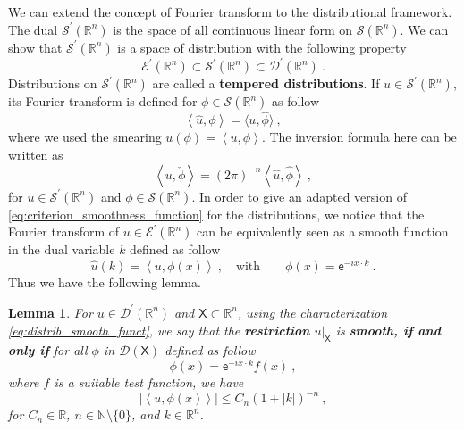 \documentclass[11pt]{book}
\newcommand{\abs}[1]{\left|#1\right|}
\newcommand{\sm}[1]{\left\langle#1\right\rangle}
\newcommand{\Dcal}{\mathcal{D}}
\newcommand{\Ecal}{\mathcal{E}}
\newcommand{\Scal}{\mathcal{S}}
\newcommand{\Nbb}{\mathbb{N}}
\newcommand{\Rbb}{\mathbb{R}}
\newcommand{\Xsf}{\mathsf{X}}
\newcommand{\esf}{\mathsf{e}}
\theoremstyle{break}
\newtheorem{lemma}{Lemma}[chapter]
\begin{document}
We can extend the concept of Fourier transform to the distributional framework. The dual $\Scal^\prime(\Rbb^n)$ is the space of all continuous linear form on $\Scal(\Rbb^n)$. We can show that $\Scal^\prime(\Rbb^n)$ is a space of distribution with the following property
%
\begin{equation*}
\Ecal^\prime(\Rbb^n) \subset \Scal^\prime(\Rbb^n) \subset \Dcal^\prime(\Rbb^n) \ .
\end{equation*}
%
Distributions on $\Scal^\prime(\Rbb^n)$ are called a \textbf{tempered distributions}. If $u \in \Scal^\prime(\Rbb^n)$, its Fourier transform is defined for $\phi \in \Scal(\Rbb^n)$ as follow
%
\begin{equation}
\sm{\hat{u},\phi} = \langle u,\hat{\phi}\rangle \ ,
\label{eq:fourier_distrib}
\end{equation}
%
where we used the smearing $u(\phi) = \sm{u,\phi}$. The inversion formula here can be written as
%
\begin{equation}
\sm{u,\check{\phi}} = (2\pi)^{-n} \sm{\hat{u} , \hat{\phi}} \ ,
\label{eq:inversion_fourier_distrib}
\end{equation}
%
for $u \in \Scal^\prime(\Rbb^ n)$ and $\phi \in \Scal(\Rbb^n)$. In order to give an adapted version of \eqref{eq:criterion_smoothness_function}  for the distributions, we notice that the Fourier transform of $u \in \Ecal^\prime(\Rbb^n)$ can be equivalently seen as a smooth function in the dual variable $k$ defined as follow
%
\begin{equation}
\hat{u}(k) = \sm{ u , \phi(x) } \ , \quad \mbox{with} \qquad \phi(x) = \esf^{-i x \cdot k} \ .
\label{eq:distrib_smooth_funct}
\end{equation}
%
Thus we have the following lemma.


\begin{lemma}\label{lem:smooth_criterion_distrib}
For $u \in \Dcal^\prime(\Rbb^n)$ and $\Xsf \subset \Rbb^n$, using the characterization \eqref{eq:distrib_smooth_funct}, we say that the \textbf{restriction} $\left.u\right|_{\Xsf}$ is \textbf{smooth, if and only if} for all $\phi$ in $\Dcal(\Xsf)$ defined as follow
%
\begin{equation*}
\phi(x) = \esf^{-i x \cdot k} f(x) \ ,
\end{equation*}
%
where $f$ is a suitable test function, we have 
%
\begin{equation}
\abs{\sm{ u , \phi(x) }} \leq C_n (1+\abs{k})^{-n} \ , 
\label{eq:smooth_criterion_distrib}
\end{equation}
for $C_n \in \Rbb$, $n \in \Nbb \setminus \{0\}$, and $k\in \Rbb^n$.
\end{lemma}
\end{document}
